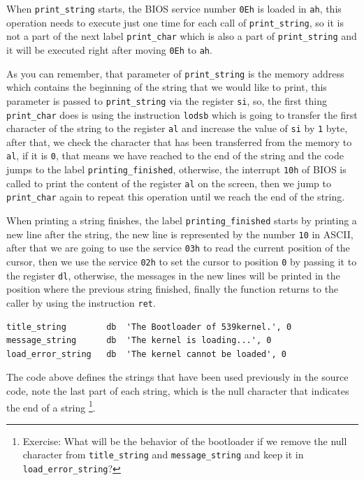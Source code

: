 When \lstinline!print_string! starts, the BIOS service number
\lstinline!0Eh! is loaded in \lstinline!ah!, this operation needs to
execute just one time for each call of \lstinline!print_string!, so it
is not a part of the next label \lstinline!print_char! which is also a
part of \lstinline!print_string! and it will be executed right after
moving \lstinline!0Eh! to \lstinline!ah!.

As you can remember, that parameter of \lstinline!print_string! is the
memory address which contains the beginning of the string that we would
like to print, this parameter is passed to \lstinline!print_string! via
the register \lstinline!si!, so, the first thing \lstinline!print_char!
does is using the instruction \lstinline!lodsb! which is going to
transfer the first character of the string to the register
\lstinline!al! and increase the value of \lstinline!si! by \lstinline!1!
byte, after that, we check the character that has been transferred from
the memory to \lstinline!al!, if it is \lstinline!0!, that means we have
reached to the end of the string and the code jumps to the label
\lstinline!printing_finished!, otherwise, the interrupt \lstinline!10h!
of BIOS is called to print the content of the register \lstinline!al! on
the screen, then we jump to \lstinline!print_char! again to repeat this
operation until we reach the end of the string.

When printing a string finishes, the label \lstinline!printing_finished!
starts by printing a new line after the string, the new line is
represented by the number \lstinline!10! in ASCII, after that we are
going to use the service \lstinline!03h! to read the current position of
the cursor, then we use the service \lstinline!02h! to set the cursor to
position \lstinline!0! by passing it to the register \lstinline!dl!,
otherwise, the messages in the new lines will be printed in the position
where the previous string finished, finally the function returns to the
caller by using the instruction \lstinline!ret!.

\begin{lstlisting}
title_string        db  'The Bootloader of 539kernel.', 0
message_string      db  'The kernel is loading...', 0
load_error_string   db  'The kernel cannot be loaded', 0
\end{lstlisting}

The code above defines the strings that have been used previously in the
source code, note the last part of each string, which is the null
character that indicates the end of a string \footnote{Exercise: What
  will be the behavior of the bootloader if we remove the null character
  from \lstinline!title_string! and \lstinline!message_string! and keep
  it in \lstinline!load_error_string!?}.

